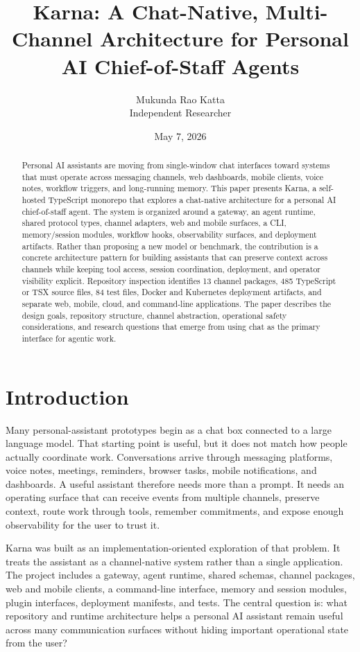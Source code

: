 \documentclass[11pt]{article}
\title{Karna: A Chat-Native, Multi-Channel Architecture for Personal AI Chief-of-Staff Agents}
\author{Mukunda Rao Katta\\Independent Researcher}
\date{May 7, 2026}
\begin{document}
\maketitle
\begin{abstract}

Personal AI assistants are moving from single-window chat interfaces toward systems that must operate across messaging channels, web dashboards, mobile clients, voice notes, workflow triggers, and long-running memory. This paper presents Karna, a self-hosted TypeScript monorepo that explores a chat-native architecture for a personal AI chief-of-staff agent. The system is organized around a gateway, an agent runtime, shared protocol types, channel adapters, web and mobile surfaces, a CLI, memory/session modules, workflow hooks, observability surfaces, and deployment artifacts. Rather than proposing a new model or benchmark, the contribution is a concrete architecture pattern for building assistants that can preserve context across channels while keeping tool access, session coordination, deployment, and operator visibility explicit. Repository inspection identifies 13 channel packages, 485 TypeScript or TSX source files, 84 test files, Docker and Kubernetes deployment artifacts, and separate web, mobile, cloud, and command-line applications. The paper describes the design goals, repository structure, channel abstraction, operational safety considerations, and research questions that emerge from using chat as the primary interface for agentic work.

\end{abstract}
\section{Introduction}

Many personal-assistant prototypes begin as a chat box connected to a large language model. That starting point is useful, but it does not match how people actually coordinate work. Conversations arrive through messaging platforms, voice notes, meetings, reminders, browser tasks, mobile notifications, and dashboards. A useful assistant therefore needs more than a prompt. It needs an operating surface that can receive events from multiple channels, preserve context, route work through tools, remember commitments, and expose enough observability for the user to trust it.

Karna was built as an implementation-oriented exploration of that problem. It treats the assistant as a channel-native system rather than a single application. The project includes a gateway, agent runtime, shared schemas, channel packages, web and mobile clients, a command-line interface, memory and session modules, plugin interfaces, deployment manifests, and tests. The central question is: what repository and runtime architecture helps a personal AI assistant remain useful across many communication surfaces without hiding important operational state from the user?
\end{document}
